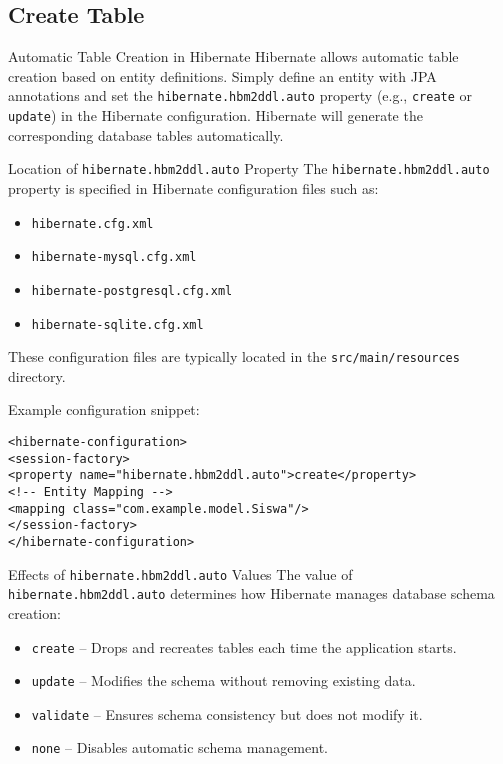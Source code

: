 \documentclass[aspectratio=169, table]{beamer}
\begin{document}
\subsection{Create Table}

\begin{frame}{Automatic Table Creation in Hibernate}
\vspace{20pt}
Hibernate allows automatic table creation based on entity definitions.
Simply define an entity with JPA annotations and set the \texttt{hibernate.hbm2ddl.auto} property (e.g., \texttt{create} or \texttt{update}) in the Hibernate configuration.
Hibernate will generate the corresponding database tables automatically.
\end{frame}

\begin{frame}[fragile]{Location of \texttt{hibernate.hbm2ddl.auto} Property}
\vspace{20pt}
The \texttt{hibernate.hbm2ddl.auto} property is specified in Hibernate configuration files such as:
\begin{itemize}
\item \texttt{hibernate.cfg.xml}
\item \texttt{hibernate-mysql.cfg.xml}
\item \texttt{hibernate-postgresql.cfg.xml}
\item \texttt{hibernate-sqlite.cfg.xml}
\end{itemize}

These configuration files are typically located in the \texttt{src/main/resources} directory.

Example configuration snippet:
\begin{lstlisting}[style=XmlStyle]
<hibernate-configuration>
<session-factory>
<property name="hibernate.hbm2ddl.auto">create</property>
<!-- Entity Mapping -->
<mapping class="com.example.model.Siswa"/>
</session-factory>
</hibernate-configuration>
\end{lstlisting}
\end{frame}

\begin{frame}{Effects of \texttt{hibernate.hbm2ddl.auto} Values}
\vspace{20pt}
The value of \texttt{hibernate.hbm2ddl.auto} determines how Hibernate manages database schema creation:
\begin{itemize}
\item \texttt{create} – Drops and recreates tables each time the application starts.
\item \texttt{update} – Modifies the schema without removing existing data.
\item \texttt{validate} – Ensures schema consistency but does not modify it.
\item \texttt{none} – Disables automatic schema management.
\end{itemize}
\end{frame}
\end{document}
